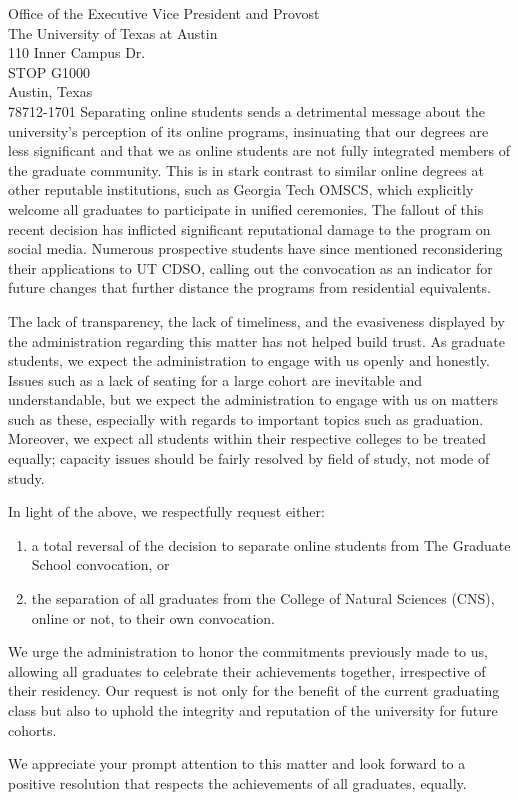\documentclass[11pt]{letter}
\begin{document}
\begin{letter}{Office of the Executive Vice President and Provost \\ The University of Texas at Austin \\ 110 Inner Campus Dr. \\ STOP G1000 \\ Austin, Texas \\ 78712-1701}
    Separating online students sends a detrimental message about the university's perception of its online programs, insinuating that our degrees are less significant and that we as online students are not fully integrated members of the graduate community. This is in stark contrast to similar online degrees at other reputable institutions, such as Georgia Tech OMSCS, which explicitly welcome all graduates to participate in unified ceremonies. The fallout of this recent decision has inflicted significant reputational damage to the program on social media. Numerous prospective students have since mentioned reconsidering their applications to UT CDSO, calling out the convocation as an indicator for future changes that further distance the programs from residential equivalents.
    
    The lack of transparency, the lack of timeliness, and the evasiveness displayed by the administration regarding this matter has not helped build trust. As graduate students, we expect the administration to engage with us openly and honestly. Issues such as a lack of seating for a large cohort are inevitable and understandable, but we expect the administration to engage with us on matters such as these, especially with regards to important topics such as graduation. Moreover, we expect all students within their respective colleges to be treated equally; capacity issues should be fairly resolved by field of study, not mode of study.

    In light of the above, we respectfully request either:
    \begin{enumerate}
        \item a total reversal of the decision to separate online students from The Graduate School convocation, or
        \item the separation of all graduates from the College of Natural Sciences (CNS), online or not, to their own convocation.
    \end{enumerate}

    We urge the administration to honor the commitments previously made to us, allowing all graduates to celebrate their achievements together, irrespective of their residency. Our request is not only for the benefit of the current graduating class but also to uphold the integrity and reputation of the university for future cohorts.

    We appreciate your prompt attention to this matter and look forward to a positive resolution that respects the achievements of all graduates, equally.


\end{letter}
\end{document}
